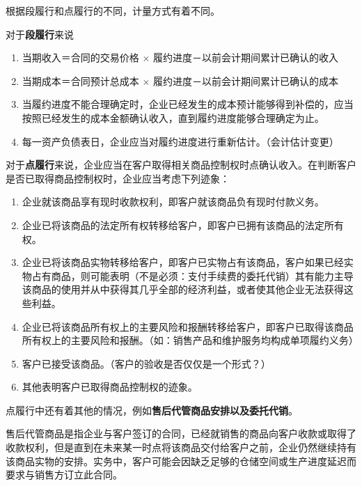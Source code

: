 \documentclass[UTF8,12pt]{ctexart}
\numberwithin{equation}{section} %
\numberwithin{figure}{section}
\numberwithin{table}{section}
\begin{document}
	根据段履行和点履行的不同，计量方式有着不同。
	
	对于\textbf{段履行}来说
	\begin{enumerate}
		\item 当期收入＝合同的交易价格 $\times$ 履约进度－以前会计期间累计已确认的收入
		
		\item 当期成本＝合同预计总成本 $\times$ 履约进度－以前会计期间累计已确认的成本
		
		\item 当履约进度不能合理确定时，企业已经发生的成本预计能够得到补偿的，应当按照已经发生的成本金额确认收入，直到履约进度能够合理确定为止。
		
		\item 每一资产负债表日，企业应当对履约进度进行重新估计。（会计估计变更）
	\end{enumerate}
	
	对于\textbf{点履行}来说，企业应当在客户取得相关商品控制权时点确认收入。在判断客户是否已取得商品控制权时，企业应当考虑下列迹象：
	\begin{enumerate}
		\item 企业就该商品享有现时收款权利，即客户就该商品负有现时付款义务。
		
		\item 企业已将该商品的法定所有权转移给客户，即客户已拥有该商品的法定所有权。
		
		\item 企业已将该商品实物转移给客户，即客户已实物占有该商品，客户如果已经实物占有商品，则可能表明（不是必须：支付手续费的委托代销）其有能力主导该商品的使用并从中获得其几乎全部的经济利益，或者使其他企业无法获得这些利益。
		
		\item 企业已将该商品所有权上的主要风险和报酬转移给客户，即客户已取得该商品所有权上的主要风险和报酬。（如：销售产品和维护服务均构成单项履约义务）
		
		\item 客户已接受该商品。（客户的验收是否仅仅是一个形式？）
		
		\item 其他表明客户已取得商品控制权的迹象。
	\end{enumerate}

	点履行中还有着其他的情况，例如\textbf{售后代管商品安排以及委托代销}。
	
	售后代管商品是指企业与客户签订的合同，已经就销售的商品向客户收款或取得了收款权利，但是直到在未来某一时点将该商品交付给客户之前，企业仍然继续持有该商品实物的安排。实务中，客户可能会因缺乏足够的仓储空间或生产进度延迟而要求与销售方订立此合同。
	
\end{document}

